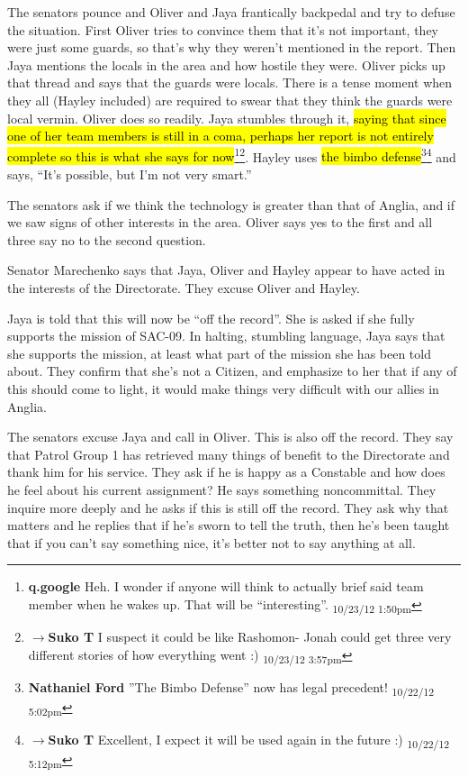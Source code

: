 The senators pounce and Oliver and Jaya frantically backpedal and try to defuse the situation.  First Oliver tries to convince them that it's not important, they were just some guards, so that's why they weren't mentioned in the report.  Then Jaya mentions the locals in the area and how hostile they were.  Oliver picks up that thread and says that the guards were locals.  There is a tense moment when they all (Hayley included) are required to swear that they think the guards were local vermin.  Oliver does so readily. Jaya stumbles through it, \hl{saying that since one of her team members is still in a coma, perhaps her report is not entirely complete so this is what she says for now}\footnote{\textbf{q.google }Heh.  I wonder if anyone will think to actually brief said team member when he wakes up.  That will be ``interesting''. \textsubscript{10/23/12 1:50pm}}\footnote{$\rightarrow$\textbf{Suko T }I suspect it could be like Rashomon- Jonah could get three very different stories of how everything went :) \textsubscript{10/23/12 3:57pm}}.  Hayley uses \hl{the bimbo defense}\footnote{\textbf{Nathaniel Ford }''The Bimbo Defense'' now has legal precedent! \textsubscript{10/22/12 5:02pm}}\footnote{$\rightarrow$\textbf{Suko T }Excellent, I expect it will be used again in the future :) \textsubscript{10/22/12 5:12pm}} and says, ``It's possible, but I'm not very smart.''



The senators ask if we think the technology is greater than that of Anglia, and if we saw signs of other interests in the area.  Oliver says yes to the first and all three say no to the second question. 



Senator Marechenko says that Jaya, Oliver and Hayley appear to have acted in the interests of the Directorate.  They excuse Oliver and Hayley.



Jaya is told that this will now be ``off the record''.  She is asked if she fully supports the mission of SAC-09.  In halting, stumbling language, Jaya says that she supports the mission, at least what part of the mission she has been told about.  They confirm that she's not a Citizen, and emphasize to her that if any of this should come to light, it would make things very difficult with our allies in Anglia.



The senators excuse Jaya and call in Oliver.  This is also off the record.  They say that Patrol Group 1 has retrieved many things of benefit to the Directorate and thank him for his service.  They ask if he is happy as a Constable and how does he feel about his current assignment?  He says something noncommittal.  They inquire more deeply and he asks if this is still off the record.  They ask why that matters and he replies that if he's sworn to tell the truth, then he's been taught that if you can't say something nice, it's better not to say anything at all.



